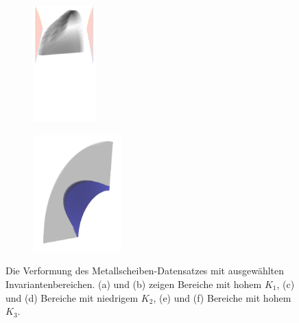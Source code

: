 \documentclass[a4paper,fontsize=12pt,toc=bib,halfparskip]{scrartcl}
\begin{document}
\begin{figure}
\begin{subfigure}{0.49\textwidth}
		\subcaption{}
		\label{MetalDiskStrainObject2}
	\end{subfigure}
	\medskip
	\begin{subfigure}{0.49\textwidth}
		\centering
		\includegraphics[height=4.5cm]{pictures/results/MetalDisk/strain/cylindrical/MetalDiskStrain_InvariantSpace3.png}
		\subcaption{}
		\label{MetalDiskStrainInvariant3}
	\end{subfigure}
	\hspace*{\fill}
	\begin{subfigure}{0.49\textwidth}
		\centering
		\includegraphics[height=4.5cm]{pictures/results/MetalDisk/strain/MetalDiskStrain_Object3.png}
		\subcaption{}
		\label{MetalDiskStrainObject3}
	\end{subfigure}
	\caption{Die Verformung des Metallscheiben-Datensatzes mit ausgew\"ahlten Invariantenbereichen. (a) und (b) zeigen Bereiche mit hohem $K_1$, (c) und (d) Bereiche mit niedrigem $K_2$, (e) und (f) Bereiche mit hohem $K_3$.}
	\label{MetalDiskStrainInteraction}
\end{figure}
\end{document}
